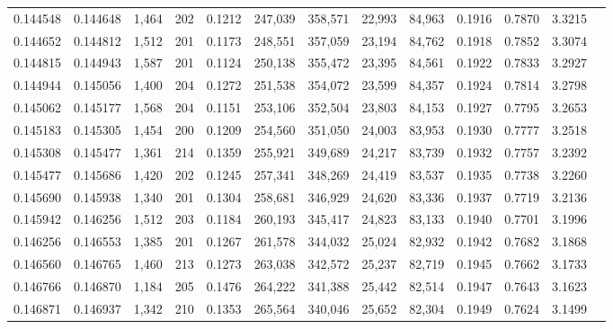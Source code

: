 \begin{tabular}{rrrrrrrrrrrrr}
0.144548 & 0.144648 & 1,464 & 202 &                                     0.1212 & 247,039 & 358,571 &  22,993 &  84,963 & 0.1916 & 0.7870 & 3.3215 \\
0.144652 & 0.144812 & 1,512 & 201 &                                     0.1173 & 248,551 & 357,059 &  23,194 &  84,762 & 0.1918 & 0.7852 & 3.3074 \\
0.144815 & 0.144943 & 1,587 & 201 &                                     0.1124 & 250,138 & 355,472 &  23,395 &  84,561 & 0.1922 & 0.7833 & 3.2927 \\
0.144944 & 0.145056 & 1,400 & 204 &                                     0.1272 & 251,538 & 354,072 &  23,599 &  84,357 & 0.1924 & 0.7814 & 3.2798 \\
0.145062 & 0.145177 & 1,568 & 204 &                                     0.1151 & 253,106 & 352,504 &  23,803 &  84,153 & 0.1927 & 0.7795 & 3.2653 \\
0.145183 & 0.145305 & 1,454 & 200 &                                     0.1209 & 254,560 & 351,050 &  24,003 &  83,953 & 0.1930 & 0.7777 & 3.2518 \\
0.145308 & 0.145477 & 1,361 & 214 &                                     0.1359 & 255,921 & 349,689 &  24,217 &  83,739 & 0.1932 & 0.7757 & 3.2392 \\
0.145477 & 0.145686 & 1,420 & 202 &                                     0.1245 & 257,341 & 348,269 &  24,419 &  83,537 & 0.1935 & 0.7738 & 3.2260 \\
0.145690 & 0.145938 & 1,340 & 201 &                                     0.1304 & 258,681 & 346,929 &  24,620 &  83,336 & 0.1937 & 0.7719 & 3.2136 \\
0.145942 & 0.146256 & 1,512 & 203 &                                     0.1184 & 260,193 & 345,417 &  24,823 &  83,133 & 0.1940 & 0.7701 & 3.1996 \\
0.146256 & 0.146553 & 1,385 & 201 &                                     0.1267 & 261,578 & 344,032 &  25,024 &  82,932 & 0.1942 & 0.7682 & 3.1868 \\
0.146560 & 0.146765 & 1,460 & 213 &                                     0.1273 & 263,038 & 342,572 &  25,237 &  82,719 & 0.1945 & 0.7662 & 3.1733 \\
0.146766 & 0.146870 & 1,184 & 205 &                                     0.1476 & 264,222 & 341,388 &  25,442 &  82,514 & 0.1947 & 0.7643 & 3.1623 \\
0.146871 & 0.146937 & 1,342 & 210 &                                     0.1353 & 265,564 & 340,046 &  25,652 &  82,304 & 0.1949 & 0.7624 & 3.1499 \\

\end{tabular}
